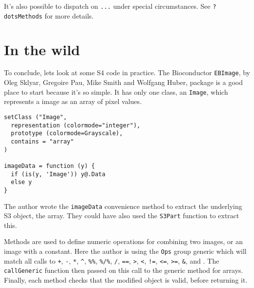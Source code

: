 \begin{Shaded}
\begin{Highlighting}[]
\NormalTok{(}\NormalTok{, }\NormalTok{(}\NormalTok{, }\NormalTok{)}
\NormalTok{(}\NormalTok{, }\NormalTok{(}\NormalTok{, }\NormalTok{)}

\NormalTok{(}\NormalTok{, } \NormalTok{)}
\StringTok{ }\NormalTok{(}\NormalTok{, }\NormalTok{)}

\end{Highlighting}
\end{Shaded}

It's also possible to dispatch on \texttt{...} under special
circumstances. See \texttt{?dotsMethods} for more details.

\section{In the wild}

To conclude, lets look at some S4 code in practice. The Bioconductor
\texttt{EBImage}, by Oleg Sklyar, Gregoire Pau, Mike Smith and Wolfgang
Huber, package is a good place to start because it's so simple. It has
only one class, an \texttt{Image}, which represents a image as an array
of pixel values.

\begin{verbatim}
setClass ("Image",
  representation (colormode="integer"),
  prototype (colormode=Grayscale),
  contains = "array"
)

imageData = function (y) {
  if (is(y, 'Image')) y@.Data
  else y
}    
\end{verbatim}

The author wrote the \texttt{imageData} convenience method to extract
the underlying S3 object, the array. They could have also used the
\texttt{S3Part} function to extract this.

Methods are used to define numeric operations for combining two images,
or an image with a constant. Here the author is using the \texttt{Ops}
group generic which will match all calls to \texttt{+}, \texttt{-},
\texttt{*}, \texttt{\^{}}, \texttt{\%\%}, \texttt{\%/\%}, \texttt{/},
\texttt{==}, \texttt{\textgreater{}}, \texttt{\textless{}}, \texttt{!=},
\texttt{\textless{}=}, \texttt{\textgreater{}=}, \texttt{\&}, and
\texttt{\textbar{}}. The \texttt{callGeneric} function then passed on
this call to the generic method for arrays. Finally, each method checks
that the modified object is valid, before returning it.

